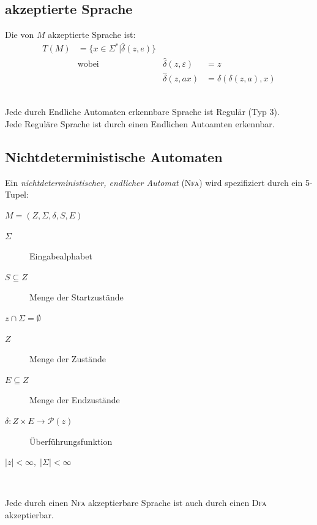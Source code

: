 \documentclass{scrartcl}
\begin{document}
\subsection*{akzeptierte Sprache}
Die von $M$ akzeptierte Sprache ist:
\begin{align*}
    T(M) &= \{x\in\Sigma^* \vert \hat\delta(z,e)\} \\
    & \textrm{wobei} & \hat\delta(z,\varepsilon)&=z \\
    & & \hat\delta(z,ax) &= \hat\delta\left(\delta(z,a),x\right)
\end{align*}

\begin{shaded}
    \ \\ Jede durch Endliche Automaten erkennbare Sprache ist Regulär (Typ 3).\\
    Jede Reguläre Sprache ist durch einen Endlichen Autoamten erkennbar.
\end{shaded}

\subsection*{Nichtdeterministische Automaten} %
Ein \emph{nichtdeterministischer, endlicher Automat} (\textsc{Nfa}) wird spezifiziert durch ein 5-Tupel: \\
\begin{minipage}{6cm}
    $M = \left(Z,\Sigma,\delta,S,E\right)$
    \begin{description}
        \item[$\Sigma$] Eingabealphabet
        \item[$S\subseteq Z$] Menge der Startzustände
        \item[$z\cap\Sigma = \emptyset$]
    \end{description}
\end{minipage}
\begin{minipage}{7cm}
\begin{description}
    \item[$Z$] Menge der Zustände
    \item[$E\subseteq Z$] Menge der Endzustände
    \item[$\delta: Z\times E\to \mathcal{P}(z)$] Überführungsfunktion
    \item[$|z|< \infty,\; |\Sigma |<\infty$]
\end{description}
\end{minipage}\\

\begin{shaded}
    Jede durch einen \textsc{Nfa} akzeptierbare Sprache ist auch durch einen \textsc{Dfa} akzeptierbar.
\end{shaded}
\end{document}
